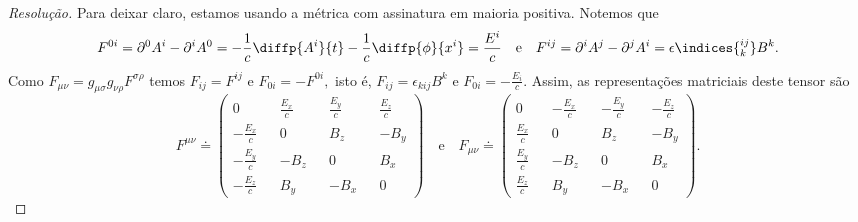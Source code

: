 \begin{proof}[Resolução]
   Para deixar claro, estamos usando a métrica com assinatura em maioria positiva. Notemos que
   \begin{equation*}
      F^{0i} = \partial^0 A^i - \partial^i A^0 = -\frac{1}{c}\diffp{A^i}{t} - \frac{1}{c} \diffp{\phi}{x^i} = \frac{E^i}{c}
      \quad\text{e}\quad
      F^{ij} = \partial^i A^j - \partial^j A^i = \epsilon\indices{_k^{ij}} B^k.
   \end{equation*}
   Como \(F_{\mu\nu} = g_{\mu \sigma}g_{\nu \rho} F^{\sigma \rho}\) temos \(F_{ij} = F^{ij}\) e \(F_{0i} = - F^{0i},\) isto é, \(F_{ij} = \epsilon_{kij}B^k\) e \(F_{0i} = -\frac{E_i}{c}\). Assim, as representações matriciais deste tensor são
   \begin{equation*}
      F^{\mu\nu} \doteq \begin{pmatrix}
         0 && \frac{E_x}{c} && \frac{E_y}{c} && \frac{E_z}{c}\\
         -\frac{E_x}{c} && 0 && B_z && -B_y\\
         -\frac{E_y}{c} && -B_z && 0 && B_x\\
         -\frac{E_z}{c} && B_y && -B_x && 0
      \end{pmatrix}
      \quad\text{e}\quad
      F_{\mu\nu} \doteq \begin{pmatrix}
         0 && -\frac{E_x}{c} && -\frac{E_y}{c} && -\frac{E_z}{c}\\
         \frac{E_x}{c} && 0 && B_z && -B_y\\
         \frac{E_y}{c} && -B_z && 0 && B_x\\
         \frac{E_z}{c} && B_y && -B_x && 0
      \end{pmatrix}.
   \end{equation*}


\end{proof}
